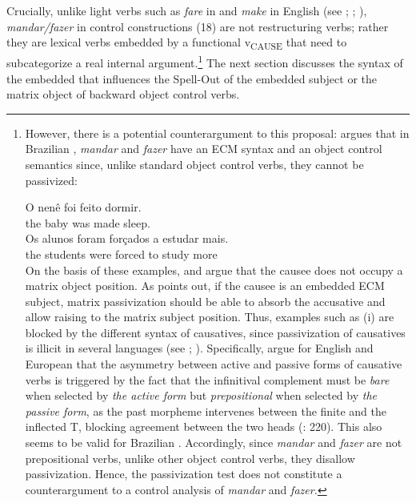 \documentclass[output=paper]{langsci/langscibook}
\begin{document}
Crucially, unlike light verbs such as \textit{fare} in  and \textit{make} in English (see \citealt{Guasti1996}; \citealt{Folli2007}; \citealt{Pylkkänen2002,Pylkkänen2008}), \textit{mandar\slash fazer} in control constructions (18) are not restructuring verbs; rather they are lexical verbs embedded by a functional v\textsubscript{CAUSE}  that need to subcategorize a real internal argument.\footnote{However, there is a potential counterargument to this proposal: \citet{Farrell1995} argues that in Brazilian , \textit{mandar} and \textit{fazer} have an ECM syntax and an object control semantics since, unlike standard object control verbs, they cannot be passivized:

\ea\gll * O nenê   foi feito    dormir.\\
          {}  the baby  was made  sleep.\\
\z
\ea\gll {} Os alunos  foram forçados  a  estudar  mais.\\
         {}  the students were  forced to study  more\\
\z
On the basis of these examples, \citet{Farrell1995} and \citet{Hornstein2003} argue that the causee does not occupy a matrix object position. As \citet{Landau2004} points out, if the causee is an embedded ECM subject, matrix passivization should be able to absorb the accusative and allow raising to the matrix subject position.   Thus, examples such as (i) are blocked by the different syntax of causatives, since passivization of causatives is illicit in several languages (see \citealt{Landau2004}; \citealt{Hornstein2008}). Specifically, \citet{Hornstein2008} argue for English and European  that the asymmetry between active and passive forms of causative verbs is triggered by the fact that the infinitival complement must be \textit{bare} when selected by \textit{the active form} but \textit{prepositional} when selected by \textit{the passive form}, as the past  morpheme intervenes between the finite and the inflected T, blocking agreement between the two heads (\citealt{Hornstein2008}: 220).  This also seems to be valid for Brazilian . Accordingly, since \textit{mandar} and \textit{fazer} are not prepositional verbs, unlike other object control verbs, they disallow passivization. Hence, the passivization test does not constitute a counterargument to a control analysis of \textit{mandar} and \textit{fazer.}} The next section discusses the syntax of the embedded  that influences the Spell-Out of the embedded subject or the matrix object of backward object control verbs. 
\end{document}
